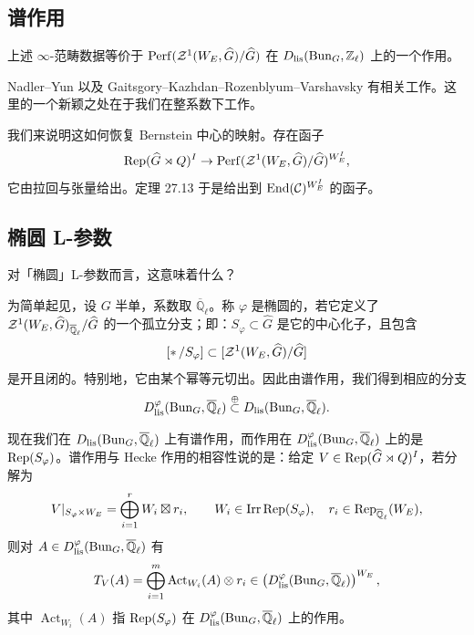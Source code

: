 \subsection{谱作用}

\begin{theorem}
上述 $\infty$-范畴数据等价于 $\mathrm{Perf}(\mathcal{Z}^1(W_E,\widehat G)/\widehat G)$ 在 $D_{\mathrm{lis}}(\mathrm{Bun}_G,\mathbb Z_\ell)$ 上的一个作用。
\end{theorem}

\begin{remark}
Nadler--Yun 以及 Gaitsgory--Kazhdan--Rozenblyum--Varshavsky 有相关工作。这里的一个新颖之处在于我们在整系数下工作。
\end{remark}

\begin{example}
我们来说明这如何恢复 Bernstein 中心的映射。存在函子
\[
\operatorname{Rep}(\widehat G\rtimes Q)^I\to\mathrm{Perf}(\mathcal{Z}^1(W_E,\widehat G)/\widehat G)^{W_E^I},
\]
它由拉回与张量给出。定理 27.13 于是给出到 $\operatorname{End}(\mathcal C)^{W_E^I}$ 的函子。
\end{example}

\subsection{椭圆 L-参数}

对「椭圆」L-参数而言，这意味着什么？

为简单起见，设 $G$ 半单，系数取 $\overline{\mathbb Q}_\ell$。称 $\varphi$ 是椭圆的，若它定义了 $\mathcal{Z}^1(W_E,\widehat G)_{\overline{\mathbb Q}_\ell}/\widehat G$ 的一个孤立分支；即：$S_\varphi\subset\widehat G$ 是它的中心化子，且包含
\[
[*\,/S_\varphi]\subset[\mathcal{Z}^1(W_E,\widehat G)/\widehat G]
\]
是开且闭的。特别地，它由某个幂等元切出。因此由谱作用，我们得到相应的分支
\[
D^\varphi_{\mathrm{lis}}(\mathrm{Bun}_G,\overline{\mathbb Q}_\ell)\overset{\oplus}{\subset}D_{\mathrm{lis}}(\mathrm{Bun}_G,\overline{\mathbb Q}_\ell).
\]


现在我们在 $D_{\mathrm{lis}}(\mathrm{Bun}_G,\overline{\mathbb Q}_\ell)$ 上有谱作用，而作用在 $D^\varphi_{\mathrm{lis}}(\mathrm{Bun}_G,\overline{\mathbb Q}_\ell)$ 上的是 $\operatorname{Rep}(S_\varphi)$。谱作用与 Hecke 作用的相容性说的是：给定 $V\in\operatorname{Rep}(\widehat G\rtimes Q)^I$，若分解为
\[
V|_{S_\varphi\times W_E}=\bigoplus_{i=1}^{r}W_i\boxtimes r_i,\qquad W_i\in\operatorname{Irr}\operatorname{Rep}(S_\varphi),\quad r_i\in\operatorname{Rep}_{\overline{\mathbb Q}_\ell}(W_E),
\]
则对 $A\in D^\varphi_{\mathrm{lis}}(\mathrm{Bun}_G,\overline{\mathbb Q}_\ell)$ 有
\[
T_V(A)=\bigoplus_{i=1}^{m}\operatorname{Act}_{W_i}(A)\otimes r_i\in\left(D^\varphi_{\mathrm{lis}}(\mathrm{Bun}_G,\overline{\mathbb Q}_\ell)\right)^{W_E},
\]
其中 $\operatorname{Act}_{W_i}(A)$ 指 $\operatorname{Rep}(S_\varphi)$ 在 $D^\varphi_{\mathrm{lis}}(\mathrm{Bun}_G,\overline{\mathbb Q}_\ell)$ 上的作用。


